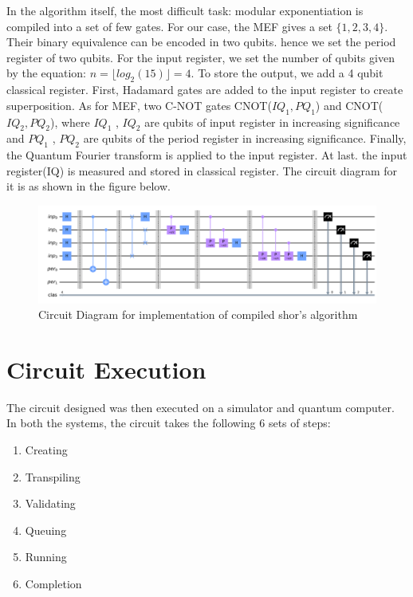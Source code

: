 In the algorithm itself, the most difficult task: modular exponentiation is compiled into a set of few gates. For our case, the MEF gives a set $\{1,2,3,4\}$. Their binary equivalence can be encoded in two qubits. hence we set the period register of two qubits. For the input register, we set the number of qubits given by the equation: $n = \lfloor log_2(15)\rfloor = 4$. To store the output, we add a 4 qubit classical register. First, Hadamard gates are added to the input register to create superposition. As for MEF, two C-NOT gates CNOT($IQ_1, PQ_1$) and CNOT($IQ_2, PQ_2$), where $IQ_1$ , $IQ_2$ are qubits of input register in increasing significance and $ PQ_1$ , $ PQ_2$ are qubits of the period register in increasing significance. Finally, the Quantum Fourier transform is applied to the input register. At last. the input register(IQ) is measured and stored in classical register. The circuit diagram for it is as shown in the figure below.

\begin{figure}[H]
    \centering
    \includegraphics[width = \linewidth]{figures/shorfor15_2.png}
  \caption{Circuit Diagram for implementation of compiled shor's algorithm}
  \label{fig: Shor compiled circuit for fermat's prime}
\end{figure}

\section{Circuit Execution}
The circuit designed was then executed on a simulator and quantum computer. In both the systems, the circuit takes the following 6 sets of steps:
\begin{enumerate}
    \item Creating
    \item Transpiling
    \item Validating
    \item Queuing
    \item Running
    \item Completion
\end{enumerate}

